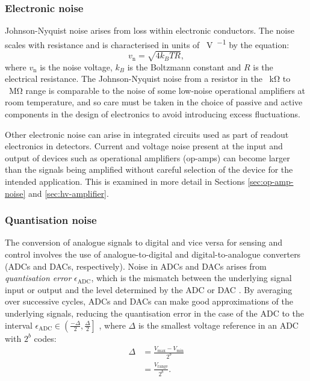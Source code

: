 \subsubsection{\label{sec:johnson-nyquist-noise}Electronic noise}
Johnson-Nyquist noise arises from loss within electronic conductors. The noise scales with resistance and is characterised in units of \SI{}{\volt\per\sqrthz} by the equation:
\begin{equation}
  v_{\text{n}} = \sqrt{4 k_B T R},
\end{equation}
where $v_{\text{n}}$ is the noise voltage, $k_B$ is the Boltzmann constant and $R$ is the electrical resistance. The Johnson-Nyquist noise from a resistor in the \SI{}{\kilo\ohm} to \SI{}{\mega\ohm} range is comparable to the noise of some low-noise operational amplifiers at room temperature, and so care must be taken in the choice of passive and active components in the design of electronics to avoid introducing excess fluctuations.

Other electronic noise can arise in integrated circuits used as part of readout electronics in detectors. Current and voltage noise present at the input and output of devices such as operational amplifiers (op-amps) can become larger than the signals being amplified without careful selection of the device for the intended application. This is examined in more detail in Sections \ref{sec:op-amp-noise} and \ref{sec:hv-amplifier}.

\subsubsection{\label{sec:quantisation-noise}Quantisation noise}
The conversion of analogue signals to digital and vice versa for sensing and control involves the use of analogue-to-digital and digital-to-analogue converters (\glspl{ADC} and \glspl{DAC}, respectively). Noise in \glspl{ADC} and \glspl{DAC} arises from \emph{quantisation error} $\epsilon_{\text{ADC}}$, which is the mismatch between the underlying signal input or output and the level determined by the \gls{ADC} or \gls{DAC} \cite{Allen1997}. By averaging over successive cycles, \glspl{ADC} and \glspl{DAC} can make good approximations of the underlying signals, reducing the quantisation error in the case of the \gls{ADC} to the interval $\epsilon_{\text{ADC}} \in \left( \frac{-\Delta}{2}, \frac{\Delta}{2} \right]$ \cite{Allen1997}, where $\Delta$ is the smallest voltage reference in an \gls{ADC} with $2^b$ codes:
\begin{equation}
  \begin{split}
    \Delta &= \frac{V_{\text{max}} - V_{\text{min}}}{2^{b}} \\
           &= \frac{V_{\text{range}}}{2^{b}}.
  \end{split}
\end{equation}

